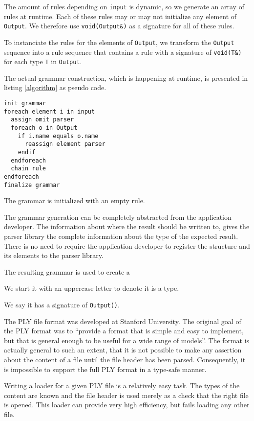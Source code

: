 \documentclass[a4paper,parskip=half,twocolumn]{scrartcl}
\begin{document}
The amount of rules depending on \texttt{input} is dynamic, so we generate an
array of rules at runtime. Each of these rules may or may not initialize any
element of \texttt{Output}. We therefore use \texttt{void(Output\&)} as a
signature for all of these rules.

To instanciate the rules for the elements of \texttt{Output}, we transform
the \texttt{Output} sequence into a rule sequence that contains a rule with a
signature of \texttt{void(T\&)} for each type \texttt{T} in \texttt{Output}.

The actual grammar construction, which is happening at runtime, is presented in
listing \ref{algorithm} as pseudo code.

\begin{lstlisting}[frame=tb,label=algorithm,caption=grammar construction algorithm]
init grammar
foreach element i in input
  assign omit parser
  foreach o in Output
    if i.name equals o.name
      reassign element parser
    endif
  endforeach
  chain rule
endforeach
finalize grammar
\end{lstlisting}

The grammar is initialized with an empty rule. 


The grammar generation can be completely abstracted from the application
developer. The information about where the result should be written to, gives
the parser library the complete information about the type of the expected
result. There is no need to require the application developer to register
the structure and its elements to the parser library.






The resulting grammar is used to create a

We start it with an uppercase letter to denote it is a type. 

We say it has a signature of \texttt{Output()}.




The PLY file format was developed at Stanford University. The original goal of
the PLY format was to ``provide a format that is simple and easy to implement,
but that is general enough to be useful for a wide range of models''. The format
is actually general to such an extent, that it is not possible to make any
assertion about the content of a file until the file header has been parsed.
Consequently, it is impossible to support the full PLY format in a type-safe
manner.

Writing a loader for a given PLY file is a relatively easy task. The types of
the content are known and the file header is used merely as a check that the
right file is opened. This loader can provide very high efficiency, but fails
loading any other file.
\end{document}
